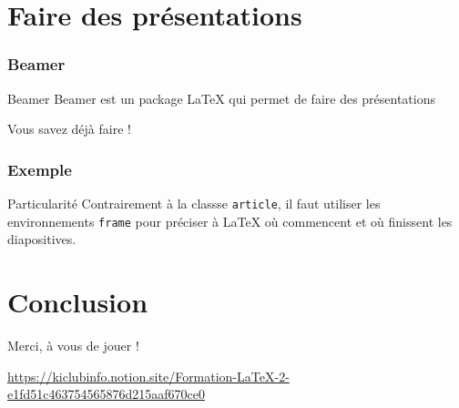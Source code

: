 \documentclass{beamer}
\begin{document}
    \section{Faire des présentations}
    \begin{frame}
        \frametitle{Beamer}
        \begin{block}{Beamer}
            Beamer est un package LaTeX qui permet de faire des présentations
        \end{block}
        \centering
        \Huge{Vous savez déjà faire !}
    \end{frame}
    \begin{frame}
        \frametitle{Exemple}
        \begin{alertblock}{Particularité}
            Contrairement à la classse \texttt{article}, il faut utiliser les environnements \texttt{frame} pour
            préciser à \LaTeX{} où commencent et où finissent les diapositives.
        \end{alertblock}

        
    \end{frame}
    \section{Conclusion}
    \begin{frame}
        \centering
        \Huge Merci, à vous de jouer !
        
        \vspace{1cm}

        \normalsize\url{https://kiclubinfo.notion.site/Formation-LaTeX-2-e1fd51c463754565876d215aaf670ce0}

        \vspace{.5cm}
    \end{frame}
\end{document}
